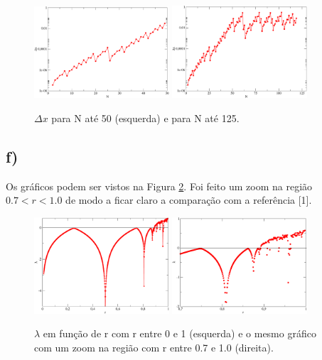 \documentclass[a4wide]{report}
\begin{document}
\begin{figure}[!htb]
\centering
\includegraphics[width=0.447\textwidth]{livro.pdf}
\includegraphics[width=0.447\textwidth]{total.pdf}
\caption{ $\Delta x$ para N até 50 (esquerda) e para N até 125.  }
\label{e)}
\end{figure}


\subsection*{f)}
Os gráficos podem ser vistos na Figura \ref{lambda}. Foi feito um zoom na região $0.7 < r < 1.0$ de modo a ficar claro a comparação com a referência [1]. 
\begin{figure}[!htb]
\centering
\includegraphics[width=0.447\textwidth]{tudo.pdf}
\includegraphics[width=0.447\textwidth]{data.pdf}
\caption{$\lambda$ em função de r com r entre 0 e 1 (esquerda) e o mesmo gráfico com um zoom na região com r entre 0.7 e 1.0 (direita). }
\label{lambda}
\end{figure}
\end{document}
